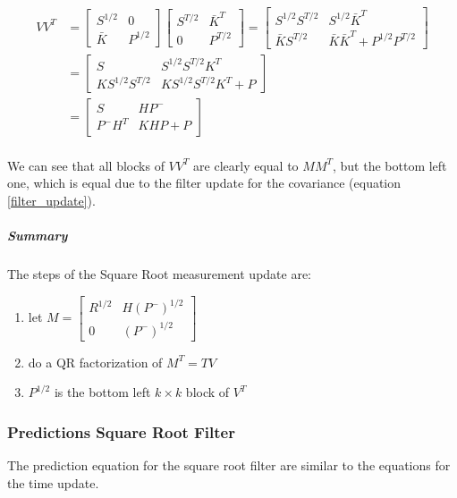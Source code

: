 \documentclass{article}
\let\Oldsubsubsection\subsubsection
\renewcommand{\subsubsection}{\FloatBarrier\Oldsubsubsection}
\begin{document}
\begin{equation}
\begin{split}
VV^T & = \begin{bmatrix} S^{1/2} & 0 \\ \bar{K} & P^{1/2} \end{bmatrix}\begin{bmatrix} S^{T/2} & \bar{K}^T \\ 0 & P^{T/2} \end{bmatrix} = \begin{bmatrix} S^{1/2}S^{T/2} & S^{1/2}\bar{K}^T \\ \bar{K}S^{T/2} & \bar{K}\bar{K}^T + P^{1/2}P^{T/2} \end{bmatrix}\\
 & = \begin{bmatrix} S & S^{1/2}S^{T/2}K^T \\ KS^{1/2}S^{T/2} & KS^{1/2}S^{T/2}K^T + P\end{bmatrix} \\
 & = \begin{bmatrix} S & HP^- \\ P^-H^T & KHP + P\end{bmatrix} \\
\end{split}
\end{equation}

We can see that all blocks of $VV^T$ are clearly equal to $MM^T$, but the bottom left one, which is equal due to the filter update for the covariance (equation \ref{filter_update}).

\subparagraph{Summary} The steps of the Square Root measurement update are:
\begin{enumerate}
 \item let $M = \begin{bmatrix} R^{1/2} & H(P^-)^{1/2} \\ 0 & (P^-)^{1/2} \end{bmatrix}$
 \item do a QR factorization of $M^T=TV$
 \item $P^{1/2}$ is the bottom left $k \times k$ block of $V^T$
\end{enumerate}

\subsubsection{Predictions Square Root Filter}

The prediction equation for the square root filter are similar to the equations for the time update.
\end{document}
